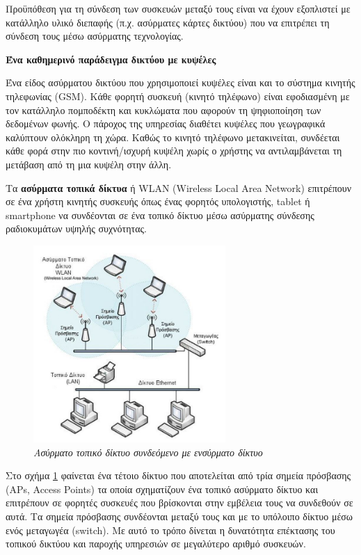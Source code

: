 Προϋπόθεση για τη σύνδεση των συσκευών μεταξύ τους είναι να έχουν εξοπλιστεί με κατάλληλο υλικό διεπαφής (π.χ. ασύρματες κάρτες δικτύου) που να επιτρέπει τη σύνδεση τους μέσω ασύρματης τεχνολογίας.

\begin{inthebox}
\textbf{Ένα καθημερινό παράδειγμα δικτύου με κυψέλες}

Ένα είδος ασύρματου δικτύου που χρησιμοποιεί κυψέλες είναι και το σύστημα κινητής τηλεφωνίας (GSM). Κάθε φορητή συσκευή (κινητό τηλέφωνο) είναι εφοδιασμένη με τον κατάλληλο πομποδέκτη και κυκλώματα που αφορούν τη ψηφιοποίηση των δεδομένων φωνής. Ο πάροχος της υπηρεσίας διαθέτει κυψέλες που γεωγραφικά καλύπτουν ολόκληρη τη χώρα. Καθώς το κινητό τηλέφωνο μετακινείται, συνδέεται κάθε φορά στην πιο κοντινή/ισχυρή κυψέλη χωρίς ο χρήστης να αντιλαμβάνεται τη μετάβαση από τη μια κυψέλη στην άλλη.\\
\end{inthebox}

Τα \textbf{ασύρματα τοπικά δίκτυα} ή WLAN (Wireless Local Area Network) επιτρέπουν σε ένα χρήστη κινητής συσκευής όπως ένας φορητός υπολογιστής, tablet ή smartphone να συνδέονται σε ένα τοπικό δίκτυο μέσω ασύρματης σύνδεσης ραδιοκυμάτων υψηλής συχνότητας.

\begin{figure}[!ht]
  \centering
  \includegraphics[width=0.65\textwidth]{images/chapter2/2-7}
  \caption {\textsl{Ασύρματο τοπικό δίκτυο συνδεόμενο με ενσύρματο δίκτυο}}
  \label{2-7}
\end{figure}

Στο σχήμα \ref{2-7} φαίνεται ένα τέτοιο δίκτυο που αποτελείται από τρία σημεία πρόσβασης (APs, Access Points) τα οποία σχηματίζουν ένα τοπικό ασύρματο δίκτυο και επιτρέπουν σε φορητές συσκευές που βρίσκονται στην εμβέλεια τους να συνδεθούν σε αυτά. Τα σημεία πρόσβασης συνδέονται μεταξύ τους και με το υπόλοιπο δίκτυο μέσω ενός μεταγωγέα (switch). Με αυτό το τρόπο δίνεται η δυνατότητα επέκτασης του τοπικού δικτύου και παροχής υπηρεσιών σε μεγαλύτερο αριθμό συσκευών. 